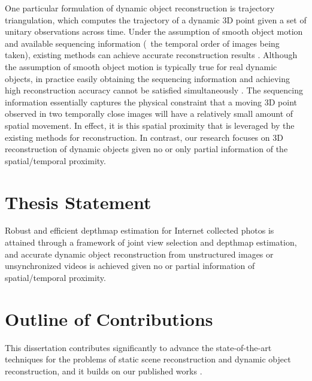 One particular formulation of dynamic object reconstruction is trajectory triangulation, which computes the trajectory of a dynamic 3D point given a set of unitary observations across time. Under the assumption of smooth object motion and available sequencing information (\ie~the temporal order of images being taken), existing methods can achieve accurate reconstruction results \cite{Park_ECCV2010,Valmadre_CVPR2012}. Although the assumption of smooth object motion is typically true for real dynamic objects, in practice easily obtaining the sequencing information and achieving high reconstruction accuracy cannot be satisfied simultaneously \cite{ZhuCL_CVPR11,Valmadre_CVPR2012}. The sequencing information essentially captures the physical constraint that a moving 3D point observed in two temporally close images will have a relatively small amount of spatial movement. In effect, it is this spatial proximity that is leveraged by the existing methods \cite{Park_ECCV2010,Valmadre_CVPR2012} for reconstruction. In contrast, our research focuses on 3D reconstruction of dynamic objects given no or only partial information of the spatial/temporal proximity.

\section{Thesis Statement}
Robust and efficient depthmap estimation for Internet collected photos is attained through a framework of joint view selection and depthmap estimation, and accurate dynamic object reconstruction from unstructured images or unsynchronized videos is achieved given no or partial information of spatial/temporal proximity.

\section{Outline of Contributions}
This dissertation contributes significantly to advance the state-of-the-art techniques for the problems of static scene reconstruction and dynamic object reconstruction, and it builds on our published works \cite{zheng2014patchmatch,zheng2014joint,zhengiccv_2015}.

